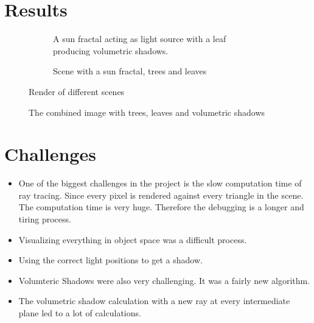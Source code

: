 \documentclass[paper=a4, fontsize=11pt]{scrartcl}
\numberwithin{equation}{section}		%
\numberwithin{figure}{section}			%
\numberwithin{table}{section}				%
\begin{document}
\newpage
\section{Results}

\vspace{20pt}
\begin{figure}[h]
\centering
\begin{subfigure}{0.5\textwidth}
\centering
{}
\caption{A sun fractal acting as light source with a leaf producing volumetric shadows.}
\end{subfigure}%
\begin{subfigure}{0.5\textwidth}
\centering
{}
\caption{Scene with a sun fractal, trees and leaves}
\end{subfigure}
\caption{Render of different scenes}
\end{figure}

\vspace{20pt}
\begin{figure}[h]
\centering
{}
\caption{The combined image with trees, leaves and volumetric shadows}
\end{figure}

\newpage
\section{Challenges}
\begin{itemize}
\item One of the biggest challenges in the project is the slow computation time of ray tracing. Since every pixel is rendered against every triangle in the scene. The computation time is very huge. Therefore the debugging is a longer and tiring process.
\item Visualizing everything in object space was a difficult process.
\item Using the correct light positions to get a shadow.
\item Volumteric Shadows were also very challenging. It was a fairly new algorithm.
\item The volumetric shadow calculation with a new ray at every intermediate plane led to a lot of calculations.
\end{itemize}
\end{document}
